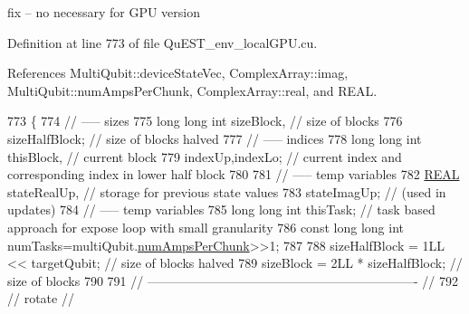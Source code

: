 fix -- no necessary for G\+PU version 

Definition at line 773 of file Qu\+E\+S\+T\+\_\+env\+\_\+local\+G\+P\+U.\+cu.



References Multi\+Qubit\+::device\+State\+Vec, Complex\+Array\+::imag, Multi\+Qubit\+::num\+Amps\+Per\+Chunk, Complex\+Array\+::real, and R\+E\+AL.


\begin{DoxyCode}
773                                                                           \{
774     \textcolor{comment}{// ----- sizes}
775     \textcolor{keywordtype}{long} \textcolor{keywordtype}{long} \textcolor{keywordtype}{int} sizeBlock,                                           \textcolor{comment}{// size of blocks}
776          sizeHalfBlock;                                       \textcolor{comment}{// size of blocks halved}
777     \textcolor{comment}{// ----- indices}
778     \textcolor{keywordtype}{long} \textcolor{keywordtype}{long} \textcolor{keywordtype}{int} thisBlock,                                           \textcolor{comment}{// current block}
779          indexUp,indexLo;                                     \textcolor{comment}{// current index and corresponding index in
       lower half block}
780 
781     \textcolor{comment}{// ----- temp variables}
782     \mbox{\hyperlink{QuEST__precision_8h_a4b654506f18b8bfd61ad2a29a7e38c25}{REAL}}   stateRealUp,                             \textcolor{comment}{// storage for previous state values}
783            stateImagUp;                             \textcolor{comment}{// (used in updates)}
784     \textcolor{comment}{// ----- temp variables}
785     \textcolor{keywordtype}{long} \textcolor{keywordtype}{long} \textcolor{keywordtype}{int} thisTask;                                   \textcolor{comment}{// task based approach for expose loop with
       small granularity}
786     \textcolor{keyword}{const} \textcolor{keywordtype}{long} \textcolor{keywordtype}{long} \textcolor{keywordtype}{int} numTasks=multiQubit.\mbox{\hyperlink{structMultiQubit_a1cad83601a78635dd278259c7ed54f18}{numAmpsPerChunk}}>>1;
787 
788     sizeHalfBlock = 1LL << targetQubit;                               \textcolor{comment}{// size of blocks halved}
789     sizeBlock     = 2LL * sizeHalfBlock;                           \textcolor{comment}{// size of blocks}
790 
791     \textcolor{comment}{// ---------------------------------------------------------------- //}
792     \textcolor{comment}{//            rotate                                                //}

\end{DoxyCode}
